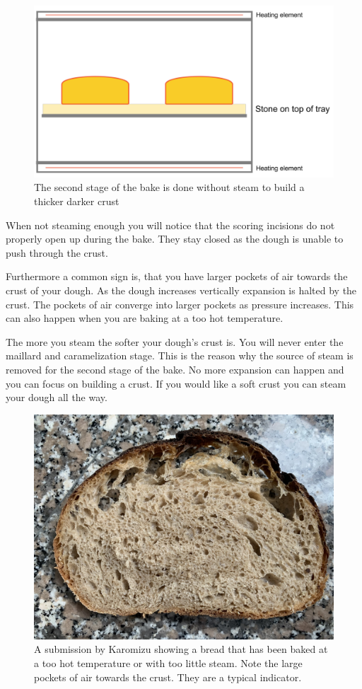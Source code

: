 \begin{figure}[!htb]
  \includegraphics[width=\textwidth]{baking-process-stage-2.jpg}
  \caption{The second stage of the bake is done without steam to build
  a thicker darker crust}
\end{figure}

When not steaming enough you will notice that the scoring
incisions do not properly open up during the bake. They stay
closed as the dough is unable to push through the crust.

Furthermore a common sign is, that you have larger pockets
of air towards the crust of your dough. As the dough increases
vertically expansion is halted by the crust. The pockets
of air converge into larger pockets as pressure increases.
This can also happen when you are baking at a too hot temperature.

The more you steam the softer your dough's crust is. You will never
enter the maillard and caramelization stage. This
is the reason why the source of steam is removed
for the second stage of the bake. No more expansion can
happen and you can focus on building a crust. If you
would like a soft crust you can steam your dough all the
way.

\begin{figure}[!htb]
  \includegraphics[width=\textwidth]{baking-too-hot.jpeg}
  \caption{A submission by Karomizu showing a bread that has been baked
  at a too hot temperature or with too little steam. Note the large
  pockets of air towards the crust. They are a typical indicator.}
\end{figure}

